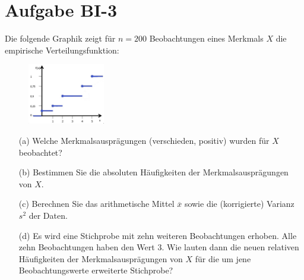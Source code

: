 
\section{Aufgabe BI-3}

\begin{task}
    Die folgende Graphik zeigt für $n=200$ Beobachtungen eines Merkmals $X$ die empirische Verteilungsfunktion:

    \begin{figure}[H]
        \begin{center}
            \includegraphics[width=0.3\textwidth]{assets/task3.png}
        \end{center}
    \end{figure}

    \begin{enumerate}
        \item[(a)] Welche Merkmalsausprägungen (verschieden, positiv) wurden für $X$ beobachtet?
    \end{enumerate}
\end{task}

\begin{task}
    \begin{enumerate}
        \item[(b)] Bestimmen Sie die absoluten Häufigkeiten der Merkmalsausprägungen von $X$.
    \end{enumerate}
\end{task}

\begin{task}
    \begin{enumerate}
        \item[(c)] Berechnen Sie das arithmetische Mittel $\overline{x}$ sowie die (korrigierte) Varianz $s^2$ der Daten.
    \end{enumerate}
\end{task}

\begin{task}
    \begin{enumerate}
        \item[(d)] Es wird eine Stichprobe mit zehn weiteren Beobachtungen erhoben. Alle zehn Beobachtungen haben den Wert $3$. Wie lauten dann die neuen relativen Häufigkeiten der Merkmalsausprägungen von $X$ für die um jene Beobachtungswerte erweiterte Stichprobe?
    \end{enumerate}
\end{task}
